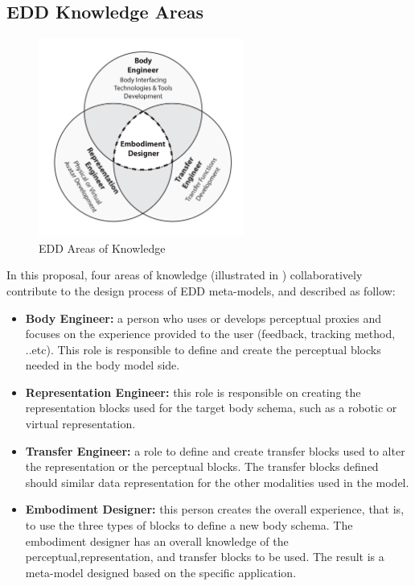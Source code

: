 \subsection{EDD Knowledge Areas}
\label{concept:EDDKnowledgeArea}
\begin{figure}[b!]
  \centering
  \captionsetup{justification=centering}
\includegraphics[width=0.6\textwidth]{figures/concept/Roles.pdf}
\caption{EDD Areas of Knowledge}
  \label{fig:concept-roles}
\end{figure}

In this proposal, four areas of knowledge (illustrated in ) collaboratively contribute to the design process of EDD meta-models, and described as follow:

\begin{itemize}
  	\setlength\itemsep{0em}
\item \textbf{Body Engineer:} a person who uses or develops perceptual proxies and focuses on the experience provided to the user (feedback, tracking method, ..etc). This role is responsible to define and create the perceptual blocks needed in the body model side.

\item   \textbf{Representation Engineer:} this role is responsible on creating the representation blocks used for the target body schema, such as a robotic or virtual representation. 

\item  \textbf{Transfer Engineer:} a role to define and create transfer blocks used to alter the representation or the perceptual blocks. The transfer blocks defined should similar data representation for the other modalities used in the model.

\item  \textbf{Embodiment Designer:} this person creates the overall experience, that is, to use the three types of blocks to define a new body schema. The embodiment designer has an overall knowledge of the perceptual,representation, and transfer blocks to be used. The result is a meta-model designed based on the specific application.
\end{itemize}

